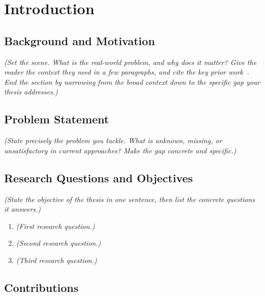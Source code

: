 \chapter{Introduction}
\label{ch:introduction}

\section{Background and Motivation}
\label{sec:motivation}

\emph{(Set the scene. What is the real-world problem, and why does it matter?
Give the reader the context they need in a few paragraphs, and cite the key
prior work~\cite{smith2024example}. End the section by narrowing from the broad
context down to the specific gap your thesis addresses.)}

\section{Problem Statement}
\label{sec:problem}

\emph{(State precisely the problem you tackle. What is unknown, missing, or
unsatisfactory in current approaches? Make the gap concrete and specific.)}

\section{Research Questions and Objectives}
\label{sec:objectives}

\emph{(State the objective of the thesis in one sentence, then list the concrete
questions it answers.)}

\begin{enumerate}[itemsep=0.3em]
  \item \emph{(First research question.)}
  \item \emph{(Second research question.)}
  \item \emph{(Third research question.)}
\end{enumerate}

\section{Contributions}
\label{sec:contributions}

